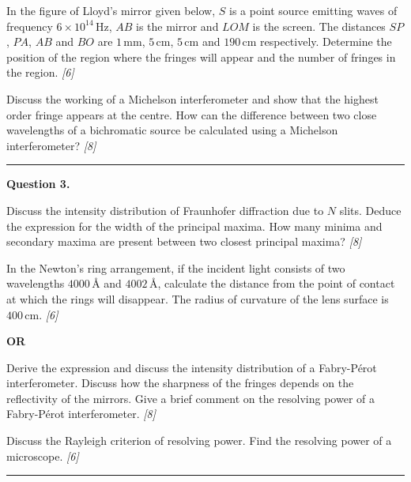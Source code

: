 \documentclass[11pt,a4paper]{article}
\newcommand{\pts}[1]{\hfill   \textit{[#1]}}
\begin{document}
\begin{parts}
  \item In the figure of Lloyd's mirror given below, $S$ is a point source emitting waves of frequency $6  \times 10^{14}\, \text{Hz}$, $AB$ is the mirror and $LOM$ is the screen. The distances $SP$, $PA$, $AB$ and $BO$ are $1\, \text{mm}$, $5\, \text{cm}$, $5\, \text{cm}$ and $190\, \text{cm}$ respectively. Determine the position of the region where the fringes will appear and the number of fringes in the region. \pts{6}
  \item Discuss the working of a Michelson interferometer and show that the highest order fringe appears at the centre. How can the difference between two close wavelengths of a bichromatic source be calculated using a Michelson interferometer? \pts{8}
\end{parts}

\medskip\rule{\linewidth}{0.2pt}




\noindent   \textbf{Question 3.}

\begin{parts}
  \item Discuss the intensity distribution of Fraunhofer diffraction due to $N$ slits. Deduce the expression for the width of the principal maxima. How many minima and secondary maxima are present between two closest principal maxima? \pts{8}
  \item In the Newton's ring arrangement, if the incident light consists of two wavelengths $4000\, \text{\AA}$ and $4002\, \text{\AA}$, calculate the distance from the point of contact at which the rings will disappear. The radius of curvature of the lens surface is $400\, \text{cm}$. \pts{6}
\end{parts}
\hfill   \textbf{OR}

\begin{parts}
  \item Derive the expression and discuss the intensity distribution of a Fabry-P\'erot interferometer. Discuss how the sharpness of the fringes depends on the reflectivity of the mirrors. Give a brief comment on the resolving power of a Fabry-P\'erot interferometer. \pts{8}
  \item Discuss the Rayleigh criterion of resolving power. Find the resolving power of a microscope. \pts{6}
\end{parts}

\medskip\rule{\linewidth}{0.2pt}
\end{document}
